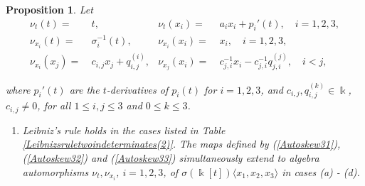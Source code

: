 \documentclass{amsart}
\newtheorem{proposition}[theorem]{Proposition}
\theoremstyle{definition}
\theoremstyle{remark}
\numberwithin{equation}{section}
\begin{document}
\begin{proposition}\label{autoSkewPBWdim3} 
Let
\begin{align}
   \nu_t(t) = &\ t, & \nu_t(x_i) = &\ a_ix_i + p_i'(t),\quad i = 1, 2, 3, \label{Autoskew31} \\ 
   \nu_{x_i}(t) = &\ \sigma_{i}^{-1}(t), & \nu_{x_i}(x_i) = &\ x_i, \quad i = 1, 2, 3, \label{Autoskew32} \\ 
   \nu_{x_i}(x_j) = &\ c_{i,j}x_j+q_{i,j}^{(i)}, & \nu_{x_j}(x_i) = &\ c_{j,i}^{-1}x_i-c_{j,i}^{-1}q_{j,i}^{(j)}, \quad i < j, \label{Autoskew33}
\end{align}

where $p_i'(t)$ are the $t$-derivatives of $p_i(t)$ for $i=1, 2, 3$, and $c_{i,j}, q_{i,j}^{(k)} \in \Bbbk$, $c_{i,j}\not =0$, for all $1\leq i,j \leq 3$ and $0\leq k \leq 3$.
\begin{enumerate}
\item [\rm (1)] Leibniz's rule holds in the cases listed in Table \ref{Leibnizsruletwoindeterminates(2)}. The maps defined by {\rm (}\ref{Autoskew31}{\rm )}, {\rm (}\ref{Autoskew32}{\rm )} and {\rm (}\ref{Autoskew33}{\rm )} simultaneously extend to algebra automorphisms $\nu_t, \nu_{x_i}$, $i=1, 2, 3$, of $\sigma(\Bbbk[t])\langle x_1, x_2, x_3\rangle$ in cases {\rm (a) - (d)}.


\end{enumerate}
\end{proposition}
\end{document}
